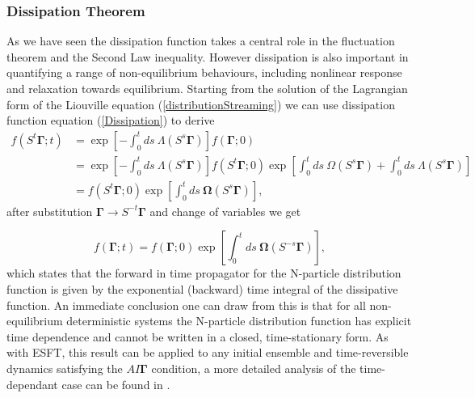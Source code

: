 \documentclass[a4paper,12pt]{article}
\begin{document}
\subsubsection{Dissipation Theorem}
\label{DissipationTheoremSection}
As we have seen the dissipation function takes a central role in the fluctuation theorem and the Second Law inequality. However dissipation is also important in quantifying a range of non-equilibrium behaviours, including nonlinear response and relaxation towards equilibrium.
Starting from the solution of the Lagrangian form of the Liouville equation (\ref{distributionStreaming}) we can use dissipation function equation (\ref{Dissipation}) to derive
\begin{equation}
\begin{aligned}
  f(S^t\bm{\Gamma};t) &= \exp[-\int_0^t ds\ \Lambda(S^s\bm{\Gamma})]f(\bm{\Gamma};0)\\
  &=\exp[-\int_0^t ds\ \Lambda(S^s\bm{\Gamma})]f(S^t \bm{\Gamma};0) \exp[\int_0^t ds\ \Omega(S^s \bm{\Gamma}) + \int_0^t ds\ \Lambda(S^s\bm{\Gamma})]\\
  &=f(S^t \bm{\Gamma};0) \exp[\int_0^t ds\ \bm{\Omega}(S^s \bm{\Gamma})],
\end{aligned}
\end{equation}
after substitution $\bm{\Gamma} \to S^{-t}\bm{\Gamma}$ and change of variables we get 

\begin{equation}
\label{distributionPropagator}
    f(\bm{\Gamma};t)=f(\bm{\Gamma};0)\exp[\int_0^t ds\ \bm{\Omega}(S^{-s} \bm{\Gamma})],
\end{equation}
which states that the forward in time propagator for the N-particle distribution function is given by the exponential (backward) time integral of the dissipative function. 
An immediate conclusion one can draw from this is that for all non-equilibrium deterministic systems the N-particle distribution function has explicit time dependence and cannot be written in a closed, time-stationary form.
As with ESFT, this result can be applied to any initial ensemble and time-reversible dynamics satisfying the $AI\bm{\Gamma}$ condition, a more detailed analysis of the time-dependant case can be found in \cite{Williams:2008ft}.
\end{document}
